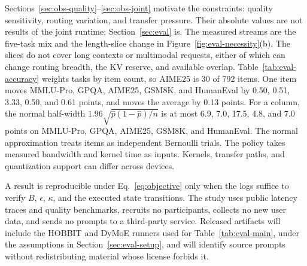 Sections~\ref{sec:obs-quality}--\ref{sec:obs-joint} motivate the constraints: quality sensitivity, routing variation, and transfer pressure.
Their absolute values are not results of the joint runtime; Section~\ref{sec:eval} is.
The measured streams are the five-task mix and the length-slice change in Figure~\ref{fig:eval-necessity}(b). The slices do not cover long contexts or multimodal requests, either of which can change routing breadth, the KV reserve, and available overlap.
Table~\ref{tab:eval-accuracy} weights tasks by item count, so AIME25 is 30 of 792 items.
One item moves MMLU-Pro, GPQA, AIME25, GSM8K, and HumanEval by 0.50, 0.51, 3.33, 0.50, and 0.61 points, and moves the average by 0.13 points.
For a column, the normal half-width \(1.96\sqrt{\hat p(1-\hat p)/n}\) is at most 6.9, 7.0, 17.5, 4.8, and 7.0 points on MMLU-Pro, GPQA, AIME25, GSM8K, and HumanEval. The normal approximation treats items as independent Bernoulli trials.
The policy takes measured bandwidth and kernel time as inputs.
Kernels, transfer paths, and quantization support can differ across devices.

A result is reproducible under Eq.~\eqref{eq:objective} only when the logs suffice to verify \(B\), \(\epsilon\), \(\kappa\), and the executed state transitions.
The study uses public latency traces and quality benchmarks, recruits no participants, collects no new user data, and sends no prompts to a third-party service.
Released artifacts will include the HOBBIT and DyMoE runners used for Table~\ref{tab:eval-main}, under the assumptions in Section~\ref{sec:eval-setup}, and will identify source prompts without redistributing material whose license forbids it.
